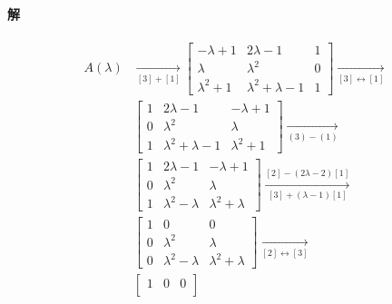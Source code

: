 \documentclass[12pt, a4paper, oneside, fontset=none]{ctexart}
\begin{document}
\paragraph*{解}
\begin{align*}
    A(\lambda) & \xrightarrow[{[3]+[1]}]{} \begin{bmatrix}
                                               -\lambda + 1  & 2 \lambda - 1           & 1 \\
                                               \lambda       & \lambda^2               & 0 \\
                                               \lambda^2 + 1 & \lambda^2 + \lambda - 1 & 1
                                           \end{bmatrix} \xrightarrow[{[3]\leftrightarrow[1]}]{} \\
               & \begin{bmatrix}
                     1 & 2 \lambda - 1           & -\lambda+1    \\
                     0 & \lambda^2               & \lambda       \\
                     1 & \lambda^2 + \lambda - 1 & \lambda^2 + 1
                 \end{bmatrix} \xrightarrow[(3) - (1)]{}                                     \\
               & \begin{bmatrix}
                     1 & 2 \lambda - 1       & -\lambda+1          \\
                     0 & \lambda^2           & \lambda             \\
                     1 & \lambda^2 - \lambda & \lambda^2 + \lambda
                 \end{bmatrix} \xrightarrow[{[3] + (\lambda - 1)[1]}]{[2] - (2\lambda - 2)[1]}   \\
               & \begin{bmatrix}
                     1 & 0                   & 0                   \\
                     0 & \lambda^2           & \lambda             \\
                     0 & \lambda^2 - \lambda & \lambda^2 + \lambda
                 \end{bmatrix} \xrightarrow[{[2]\leftrightarrow[3]}]{}                           \\
               & \begin{bmatrix}
                     1 & 0                   & 0                   \\

\end{bmatrix}
\end{align*}
\end{document}
